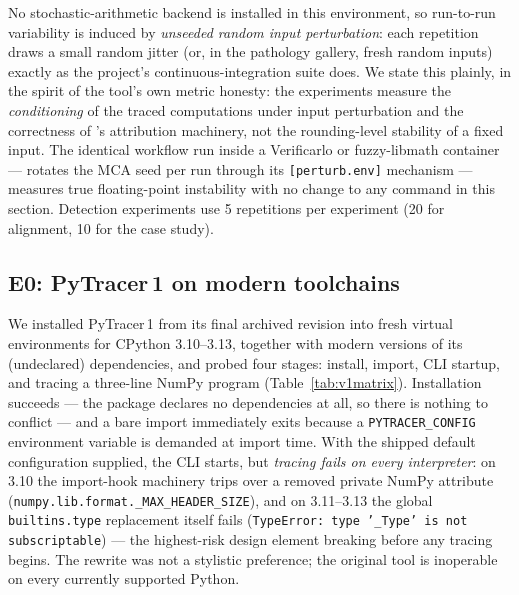 No stochastic-arithmetic backend is installed in this environment, so
run-to-run variability is induced by \emph{unseeded random input
perturbation}: each repetition draws a small random jitter (or, in the
pathology gallery, fresh random inputs) exactly as the project's
continuous-integration suite does. We state this plainly, in the spirit
of the tool's own metric honesty: the experiments measure the
\emph{conditioning} of the traced computations under input perturbation
and the correctness of \pyt{}'s attribution machinery, not the
rounding-level stability of a fixed input. The identical workflow run
inside a Verificarlo or fuzzy-libmath container --- \pyt{} rotates the MCA
seed per run through its \texttt{[perturb.env]} mechanism --- measures
true floating-point instability with no change to any command in this
section. Detection experiments use 5 repetitions per experiment
(20 for alignment, 10 for the case study).

\subsection{E0: PyTracer\,1 on modern toolchains}
\label{sec:eval-v1}

We installed PyTracer\,1 from its final archived revision into fresh
virtual environments for CPython 3.10--3.13, together with modern
versions of its (undeclared) dependencies, and probed four stages:
install, import, CLI startup, and tracing a three-line NumPy program
(Table~\ref{tab:v1matrix}). Installation succeeds --- the package
declares no dependencies at all, so there is nothing to conflict --- and
a bare import immediately exits because a \texttt{PYTRACER\_CONFIG}
environment variable is demanded at import time. With the shipped default
configuration supplied, the CLI starts, but \emph{tracing fails on every
interpreter}: on 3.10 the import-hook machinery trips over a removed
private NumPy attribute (\texttt{numpy.lib.format.\_MAX\_HEADER\_SIZE}),
and on 3.11--3.13 the global \texttt{builtins.type} replacement itself
fails (\texttt{TypeError: type '\_Type' is not subscriptable}) --- the
highest-risk design element breaking before any tracing begins. The
rewrite was not a stylistic preference; the original tool is inoperable
on every currently supported Python.

\begin{table}[t]
  \centering\small
  \caption{E0 --- PyTracer\,1 (final archived revision) on modern
  interpreters, with modern versions of its undeclared dependencies
  installed and its default configuration supplied. ``Trace'' attempts a
  three-line NumPy program.}
  \label{tab:v1matrix}
  
\end{table}

